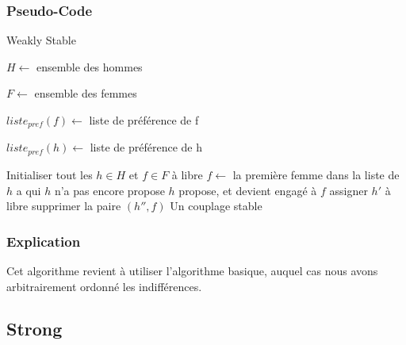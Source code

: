 \documentclass[11pt]{article}
\begin{document}
\subsubsection{Pseudo-Code}
\begin{algorithm}
\caption{Weakly Stable}
\begin{algorithmic} 
\REQUIRE 
\begin{list}{}{'}
	\item $H \leftarrow$ ensemble des hommes
	\item $F \leftarrow$ ensemble des femmes
    \item $liste_{pref}(f) \leftarrow$ liste de préférence de f
    \item $liste_{pref}(h) \leftarrow$ liste de préférence de h
\end{list} 

\STATE Initialiser tout les $h \in H$ et $f \in F$ à libre
\STATE $f \leftarrow$ la première femme dans la liste de $h$ a qui $h$ n'a pas
encore propose
\STATE $h$ propose, et devient engagé à $f$
\STATE assigner $h'$ à libre
\ENDIF
{}
\STATE supprimer la paire $(h'', f)$
\ENDFOR
\ENDWHILE
\ENSURE Un couplage stable
\end{algorithmic}
\end{algorithm}
\subsubsection{Explication}

Cet algorithme revient à utiliser l'algorithme basique, auquel cas nous avons arbitrairement ordonné les indifférences. 
\subsection{Strong}
\end{document}
